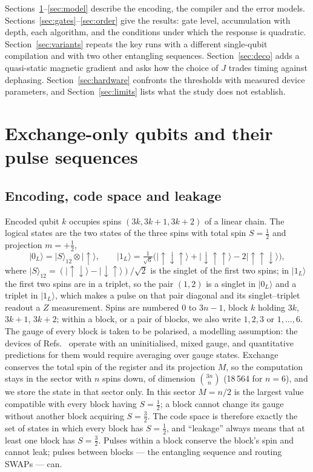 \documentclass[reprint,aps,pra,amsmath,amssymb,superscriptaddress,letterpaper]{revtex4-2}
\newcommand{\ket}[1]{\lvert #1\rangle}
\begin{document}
Sections~\ref{sec:eo}--\ref{sec:model} describe the encoding, the compiler and
the error models. Sections~\ref{sec:gates}--\ref{sec:order} give the results:
gate level, accumulation with depth, each algorithm, and the conditions under
which the response is quadratic. Section~\ref{sec:variants} repeats the key
runs with a different single-qubit compilation and with two other entangling
sequences. Section~\ref{sec:deco} adds a quasi-static magnetic gradient and
asks how the choice of $J$ trades timing against dephasing.
Section~\ref{sec:hardware} confronts the thresholds with measured device
parameters, and Section~\ref{sec:limits} lists what the study does not
establish.

\section{Exchange-only qubits and their pulse sequences}
\label{sec:eo}

\subsection{Encoding, code space and leakage}

Encoded qubit $k$ occupies spins $(3k,3k+1,3k+2)$ of a linear chain. The
logical states are the two states of the three spins with total spin
$S=\tfrac12$ and projection $m=+\tfrac12$,
\begin{equation}
 \ket{0_L}=\ket{S}_{12}\otimes\ket{\uparrow},\qquad
 \ket{1_L}=\tfrac{1}{\sqrt6}\bigl(\ket{\uparrow\downarrow\uparrow}+\ket{\downarrow\uparrow\uparrow}
 -2\ket{\uparrow\uparrow\downarrow}\bigr),
\end{equation}
where $\ket S_{12}=(\ket{\uparrow\downarrow}-\ket{\downarrow\uparrow})/\sqrt2$ is the singlet of the first two spins; in $\ket{1_L}$ the
first two spins are in a triplet, so the pair $(1,2)$ is a singlet in
$\ket{0_L}$ and a triplet in $\ket{1_L}$, which makes a pulse on that pair
diagonal and its singlet--triplet readout a $Z$ measurement. Spins are numbered $0$ to $3n-1$, block $k$ holding $3k$, $3k{+}1$, $3k{+}2$; within a block, or a pair of blocks, we also write $1,2,3$ or $1,\dots,6$. The gauge of every block is taken to be polarised, a modelling assumption: the devices of Refs.~\cite{andrews2019,hrl2026} operate with an uninitialised, mixed gauge, and quantitative predictions for them would require averaging over gauge states. Exchange conserves
the total spin of the register and its projection $M$, so the computation stays in the
sector with $n$ spins down, of dimension $\binom{3n}{n}$ (18\,564 for $n=6$),
and we store the state in that sector only. In this sector $M=n/2$ is the
largest value compatible with every block having $S=\tfrac12$; a block cannot
change its gauge without another block acquiring $S=\tfrac32$. The code space
is therefore exactly the set of states in which every block has $S=\tfrac12$,
and ``leakage'' always means that at least one block has $S=\tfrac32$. Pulses
within a block conserve the block's spin and cannot leak; pulses between
blocks --- the entangling sequence and routing SWAPs --- can.
\end{document}
